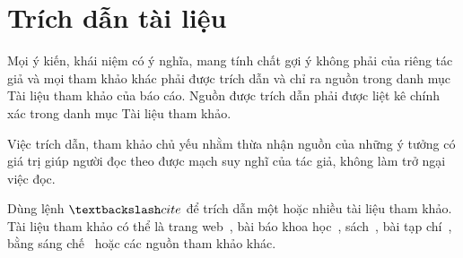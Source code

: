 \chapter{Trích dẫn tài liệu}
\label{Chapter5}

Mọi ý kiến, khái niệm có ý nghĩa, mang tính chất gợi ý không phải của riêng tác giả và mọi tham khảo khác phải được trích dẫn và chỉ ra nguồn trong danh mục Tài liệu tham khảo của báo cáo. Nguồn được trích dẫn phải được liệt kê chính xác trong danh mục Tài liệu tham khảo.

Việc trích dẫn, tham khảo chủ yếu nhằm thừa nhận nguồn của những ý tưởng có giá trị giúp người đọc theo được mạch suy nghĩ của tác giả, không làm trở ngại việc đọc.

Dùng lệnh $\textbackslash cite$ để trích dẫn một hoặc nhiều tài liệu tham khảo.
Tài liệu tham khảo có thể là trang web~\cite{algorithms2024overleaf}, bài báo khoa học~\cite{le2012human}, sách~\cite{Swanson1999Mathematics}, bài tạp chí~\cite{le2023attention}, bằng sáng chế~\cite{kim2024transformer} hoặc các nguồn tham khảo khác.